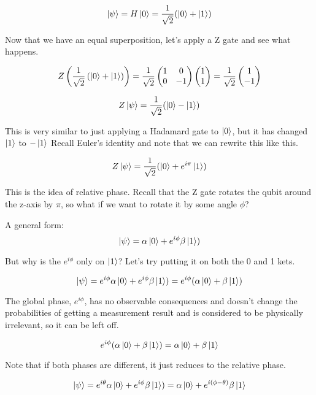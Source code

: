\documentclass[12pt]{article}
\begin{document}
$$
\ket{\psi} = H\ket{0} = \frac{1}{\sqrt{2}}( \ket{0}  + \ket{1})
$$

Now that we have an equal superposition, let's apply a Z gate and see what happens.

$$
Z\left(\frac{1}{\sqrt{2}}\left(\ket{0}+\ket{1}\right)\right)
= \frac{1}{\sqrt{2}} \begin{pmatrix} 1 & 0 \\ 0 & -1 \end{pmatrix} \begin{pmatrix} 1 \\ 1 \end{pmatrix}
= \frac{1}{\sqrt{2}} \begin{pmatrix} 1 \\ -1 \end{pmatrix}
$$


$$
Z\ket{\psi} = \frac{1}{\sqrt{2}}( \ket{0} - \ket{1})
$$

This is very similar to just applying a Hadamard gate to $\ket{0}$, but it has changed $\ket{1}$ to $-\ket{1}$ Recall Euler's identity and note that we can rewrite this like this.

$$
Z\ket{\psi} = \frac{1}{\sqrt{2}}( \ket{0} + e^{i\pi}\ket{1})
$$

This is the idea of relative phase. Recall that the Z gate rotates the qubit around the z-axis by $\pi$, so what if we want to rotate it by some angle $\phi$? 

A general form:
$$
\ket{\psi} = \alpha \ket{0} + e^{i\phi} \beta \ket{1})
$$

But why is the $e^{i\phi}$ only on $\ket{1}$? Let's try putting it on both the 0 and 1 kets.

$$
\ket{\psi} = e^{i\phi} \alpha \ket{0} + e^{i\phi} \beta \ket{1}) = e^{i\phi}(\alpha \ket{0} + \beta \ket{1})
$$

The global phase, $e^{i\phi}$, has no observable consequences and doesn't change the probabilities of getting a measurement result and is considered to be physically irrelevant, so it can be left off.\cite{Quantum_Information}

$$e^{i\phi}(\alpha \ket{0} + \beta \ket{1}) = \alpha \ket{0} + \beta \ket{1}$$




Note that if both phases are different, it just reduces to the relative phase.

$$
\ket{\psi} = e^{i\theta} \alpha \ket{0} + e^{i\phi} \beta \ket{1}) = \alpha \ket{0} + e^{i(\phi-\theta)}\beta \ket{1}
$$
\end{document}
